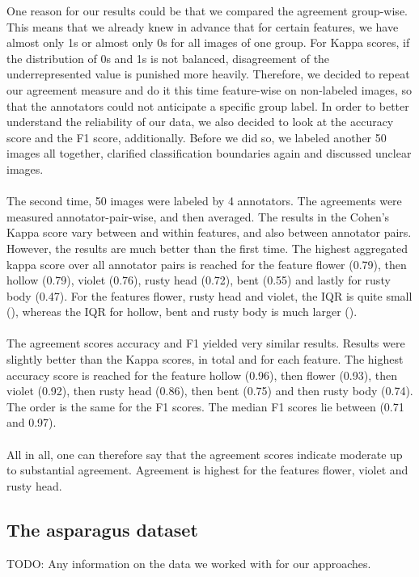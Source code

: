One reason for our results could be that we compared the agreement group-wise. This means that we already knew in advance that for certain features, we have almost only 1s or almost only 0s for all images of one group. For Kappa scores, if the distribution of 0s and 1s is not balanced, disagreement of the underrepresented value is punished more heavily. Therefore, we decided to repeat our agreement measure and do it this time feature-wise on non-labeled images, so that the annotators could not anticipate a specific group label. In order to better understand the reliability of our data, we also decided to look at the accuracy score and the F1 score, additionally. Before we did so, we labeled another 50 images all together, clarified classification boundaries again and discussed unclear images. \\
\\
The second time, 50 images were labeled by 4 annotators. The agreements were measured annotator-pair-wise, and then averaged. The results in the Cohen’s Kappa score vary between and within features, and also between annotator pairs. However, the results are much better than the first time. The highest aggregated kappa score over all annotator pairs is reached for the feature flower (0.79), then hollow (0.79), violet (0.76), rusty head (0.72), bent (0.55) and lastly for rusty body (0.47).
For the features flower, rusty head and violet, the IQR is quite small (), whereas the IQR for hollow, bent and rusty body is much larger (). \\
\\
The agreement scores accuracy and F1 yielded very similar results. Results were slightly better than the Kappa scores, in total and  for each feature. The highest accuracy score is reached for the feature hollow (0.96), then flower (0.93), then violet (0.92), then rusty head (0.86), then bent (0.75) and then rusty body (0.74). The order is the same for the F1 scores. The median F1 scores lie between (0.71 and 0.97). \\
\\
All in all, one can therefore say that the agreement scores indicate moderate up to substantial agreement. Agreement is highest for the features flower, violet and rusty head.


\subsection{The asparagus dataset}

TODO: Any information on the data we worked with for our approaches.


